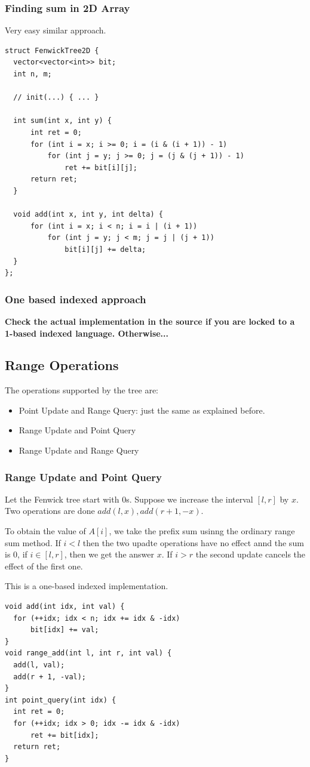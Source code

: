 \documentclass{IEEEtran}
\begin{document}
      \subsubsection{Finding sum in 2D Array}
        Very easy similar approach.
        \begin{lstlisting}
struct FenwickTree2D {
  vector<vector<int>> bit;
  int n, m;

  // init(...) { ... }

  int sum(int x, int y) {
      int ret = 0;
      for (int i = x; i >= 0; i = (i & (i + 1)) - 1)
          for (int j = y; j >= 0; j = (j & (j + 1)) - 1)
              ret += bit[i][j];
      return ret;
  }

  void add(int x, int y, int delta) {
      for (int i = x; i < n; i = i | (i + 1))
          for (int j = y; j < m; j = j | (j + 1))
              bit[i][j] += delta;
  }
};
        \end{lstlisting}
      \subsubsection{One based indexed approach}
        \textbf{Check the actual implementation in the source if you are locked to a 1-based indexed language. Otherwise...}
    \subsection{Range Operations}
      The operations supported by the tree are:
      \begin{itemize}
        \item Point Update and Range Query: just the same as explained before.
        \item Range Update and Point Query
        \item Range Update and Range Query
      \end{itemize}
      \subsubsection{Range Update and Point Query}
        Let the Fenwick tree start with 0s. Suppose we increase the interval $[l,r]$ by $x$. Two operations are done $add(l,x), add(r+1,-x)$.\par
        To obtain the value of $A[i]$, we take the prefix sum usinng the ordinary range sum method.  If $i<l$ then the two upadte operations have no effect annd the sum is $0$, if $i\in[l,r]$, then we get the answer $x$. If $i>r$ the second update cancels the effect of the first one.\par
        This is a one-based indexed implementation.
        \begin{lstlisting}
void add(int idx, int val) {
  for (++idx; idx < n; idx += idx & -idx)
      bit[idx] += val;
}
void range_add(int l, int r, int val) {
  add(l, val);
  add(r + 1, -val);
}
int point_query(int idx) {
  int ret = 0;
  for (++idx; idx > 0; idx -= idx & -idx)
      ret += bit[idx];
  return ret;
}
        \end{lstlisting}
\end{document}
